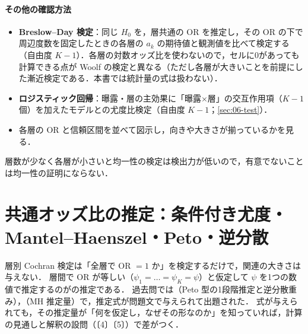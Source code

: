 \paragraph{その他の確認方法}
\begin{itemize}
\item \textbf{Breslow--Day 検定}：同じ $H_0$ を，層共通の OR を推定し，その OR の下で周辺度数を固定したときの各層の $a_k$ の期待値と観測値を比べて検定する（自由度 $K-1$）．各層の対数オッズ比を使わないので，セルに0があっても計算できる点が Woolf の検定と異なる（ただし各層が大きいことを前提にした漸近検定である．本書では統計量の式は扱わない）．
\item \textbf{ロジスティック回帰}：曝露・層の主効果に「曝露×層」の交互作用項（$K-1$ 個）を加えたモデルとの尤度比検定（自由度 $K-1$；\cref{sec:06-test}）．
\item 各層の OR と信頼区間を並べて図示し，向きや大きさが揃っているかを見る．
\end{itemize}
\Youchui 層数が少なく各層が小さいと均一性の検定は検出力が低いので，有意でないことは均一性の証明にならない．

\section{共通オッズ比の推定：条件付き尤度・Mantel--Haenszel・Peto・逆分散}\label{sec:07-commonor}
\Hissu\Hinshutsu
層別 Cochran 検定は「全層で OR $=1$ か」を検定するだけで，関連の大きさは与えない．
層間で OR が等しい（$\psi_1=\dots=\psi_K=\psi$）と仮定して $\psi$ を1つの数値で推定するのがの推定である．
過去問では（Peto 型の1段階推定と逆分散重み），（MH 推定量）で，推定式が問題文で与えられて出題された．
式が与えられても，その推定量が「何を仮定し，なぜその形なのか」を知っていれば，計算の見通しと解釈の設問（〔4〕〔5〕）で差がつく．

